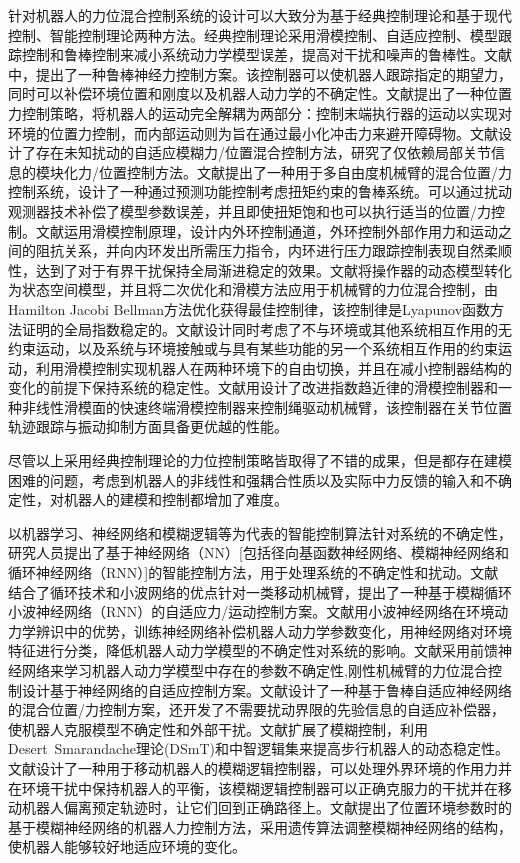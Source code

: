 \documentclass[12pt,a4paper,openany,oneside]{book}%
\numberwithin{equation}{chapter}%
\numberwithin{figure}{chapter}%
\begin{document}
针对机器人的力位混合控制系统的设计可以大致分为基于经典控制理论和基于现代控制、智能控制理论两种方法。经典控制理论采用滑模控制、自适应控制、模型跟踪控制和鲁棒控制来减小系统动力学模型误差，提高对干扰和噪声的鲁棒性。文献\cite{r14}中，提出了一种鲁棒神经力控制方案。该控制器可以使机器人跟踪指定的期望力，同时可以补偿环境位置和刚度以及机器人动力学的不确定性。文献\cite{r15}提出了一种位置力控制策略，将机器人的运动完全解耦为两部分：控制末端执行器的运动以实现对环境的位置力控制，而内部运动则为旨在通过最小化冲击力来避开障碍物。文献\cite{r16}设计了存在未知扰动的自适应模糊力/位置混合控制方法，研究了仅依赖局部关节信息的模块化力/位置控制方法。文献\cite{r17}提出了一种用于多自由度机械臂的混合位置/力控制系统，设计了一种通过预测功能控制考虑扭矩约束的鲁棒系统。可以通过扰动观测器技术补偿了模型参数误差，并且即使扭矩饱和也可以执行适当的位置/力控制。文献\cite{r171}运用滑模控制原理，设计内外环控制通道，外环控制外部作用力和运动之间的阻抗关系，并向内环发出所需压力指令，内环进行压力跟踪控制表现自然柔顺性，达到了对于有界干扰保持全局渐进稳定的效果。文献\cite{r172}将操作器的动态模型转化为状态空间模型，并且将二次优化和滑模方法应用于机械臂的力位混合控制，由Hamilton Jacobi Bellman方法优化获得最佳控制律，该控制律是Lyapunov函数方法证明的全局指数稳定的。文献\cite{r173}设计同时考虑了不与环境或其他系统相互作用的无约束运动，以及系统与环境接触或与具有某些功能的另一个系统相互作用的约束运动，利用滑模控制实现机器人在两种环境下的自由切换，并且在减小控制器结构的变化的前提下保持系统的稳定性。文献\cite{r174}用设计了改进指数趋近律的滑模控制器和一种非线性滑模面的快速终端滑模控制器来控制绳驱动机械臂，该控制器在关节位置轨迹跟踪与振动抑制方面具备更优越的性能。

尽管以上采用经典控制理论的力位控制策略皆取得了不错的成果，但是都存在建模困难的问题，考虑到机器人的非线性和强耦合性质以及实际中力反馈的输入和不确定性，对机器人的建模和控制都增加了难度。

以机器学习、神经网络和模糊逻辑等为代表的智能控制算法针对系统的不确定性，研究人员提出了基于神经网络（NN）[包括径向基函数神经网络、模糊神经网络和循环神经网络（RNN）]的智能控制方法，用于处理系统的不确定性和扰动。文献\cite{r18}结合了循环技术和小波网络的优点针对一类移动机械臂，提出了一种基于模糊循环小波神经网络（RNN）的自适应力/运动控制方案。文献\cite{r181}用小波神经网络在环境动力学辨识中的优势，训练神经网络补偿机器人动力学参数变化，用神经网络对环境特征进行分类，降低机器人动力学模型的不确定性对系统的影响。文献\cite{r182}采用前馈神经网络来学习机器人动力学模型中存在的参数不确定性,刚性机械臂的力位混合控制设计基于神经网络的自适应控制方案。文献\cite{r183}设计了一种基于鲁棒自适应神经网络的混合位置/力控制方案，还开发了不需要扰动界限的先验信息的自适应补偿器，使机器人克服模型不确定性和外部干扰。文献\cite{r184}扩展了模糊控制，利用Desert\ Smarandache理论(DSmT)和中智逻辑集来提高步行机器人的动态稳定性。文献\cite{r185}设计了一种用于移动机器人的模糊逻辑控制器，可以处理外界环境的作用力并在环境干扰中保持机器人的平衡，该模糊逻辑控制器可以正确克服力的干扰并在移动机器人偏离预定轨迹时，让它们回到正确路径上。文献\cite{r186}提出了位置环境参数时的基于模糊神经网络的机器人力控制方法，采用遗传算法调整模糊神经网络的结构，使机器人能够较好地适应环境的变化。
\end{document}
